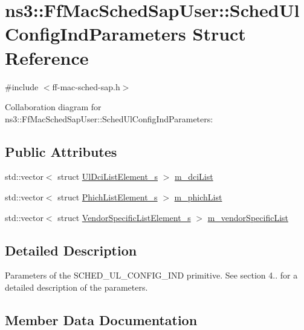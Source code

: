 \hypertarget{structns3_1_1FfMacSchedSapUser_1_1SchedUlConfigIndParameters}{}\section{ns3\+:\+:Ff\+Mac\+Sched\+Sap\+User\+:\+:Sched\+Ul\+Config\+Ind\+Parameters Struct Reference}
\label{structns3_1_1FfMacSchedSapUser_1_1SchedUlConfigIndParameters}


{\ttfamily \#include $<$ff-\/mac-\/sched-\/sap.\+h$>$}



Collaboration diagram for ns3\+:\+:Ff\+Mac\+Sched\+Sap\+User\+:\+:Sched\+Ul\+Config\+Ind\+Parameters\+:
\subsection*{Public Attributes}
\begin{DoxyCompactItemize}
\item 
std\+::vector$<$ struct \hyperlink{structns3_1_1UlDciListElement__s}{Ul\+Dci\+List\+Element\+\_\+s} $>$ \hyperlink{structns3_1_1FfMacSchedSapUser_1_1SchedUlConfigIndParameters_aef61e9596b02d9d16bcb090889f30c18}{m\+\_\+dci\+List}
\item 
std\+::vector$<$ struct \hyperlink{structns3_1_1PhichListElement__s}{Phich\+List\+Element\+\_\+s} $>$ \hyperlink{structns3_1_1FfMacSchedSapUser_1_1SchedUlConfigIndParameters_ab26f492098c355f8819697698c0aab43}{m\+\_\+phich\+List}
\item 
std\+::vector$<$ struct \hyperlink{structns3_1_1VendorSpecificListElement__s}{Vendor\+Specific\+List\+Element\+\_\+s} $>$ \hyperlink{structns3_1_1FfMacSchedSapUser_1_1SchedUlConfigIndParameters_aa8e9611a38a06b56c7f7c4ff2d959d65}{m\+\_\+vendor\+Specific\+List}
\end{DoxyCompactItemize}


\subsection{Detailed Description}
Parameters of the S\+C\+H\+E\+D\+\_\+\+U\+L\+\_\+\+C\+O\+N\+F\+I\+G\+\_\+\+I\+ND primitive. See section 4.. for a detailed description of the parameters. 

\subsection{Member Data Documentation}

